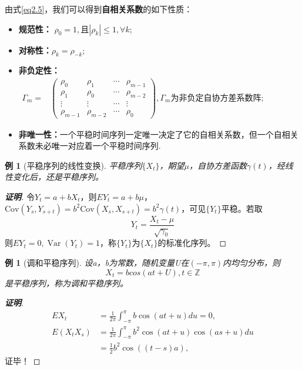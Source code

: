 \documentclass[12pt, a4paper, oneside]{ctexbook}
\newtheorem{example}[theorem]{例}
\newcommand\zm[2]{\begin{proof}[\textbf{#1}]
    #2
\end{proof}}
\newcommand\mb[1]{\mathbb{#1}}
\begin{document}
由式\ref{eq2.5}，我们可以得到\textbf{自相关系数}的如下性质：
\begin{itemize}
    \item \textbf{规范性：} $\rho_0=1,\text{且}|\rho_k|\leq1,\forall k$;
    \item \textbf{对称性：}$\rho_k=\rho_{-k}$;
    \item \textbf{非负定性：}$\begin{aligned}
                  \Gamma_m= & \begin{pmatrix}
                                  \rho_0     & \rho_1     & \cdots & \rho_{m-1} \\
                                  \rho_1     & \rho_0     & \cdots & \rho_{m-2} \\
                                  \vdots     & \vdots     & \cdots & \vdots     \\
                                  \rho_{m-1} & \rho_{m-2} & \cdots & \rho_0
                              \end{pmatrix},\Gamma_m\text{为非负定自协方差系数阵};
              \end{aligned}$
    \item \textbf{非唯一性：}一个平稳时间序列一定唯一决定了它的自相关系数，但一个自相关系数未必唯一对应着一个平稳时间序列.
\end{itemize}

\begin{example}[平稳序列的线性变换]
    平稳序列$\{X_t\}$，期望$\mu$，自协方差函数$\gamma(t)$，经线性变化后，还是平稳序列。
\end{example}
\zm{证明}{令$Y_t=a+bX_t$，则$EY_t=a+b\mu$，$\mathrm{Cov}(Y_s,Y_{s+t})=b^2\mathrm{Cov}(X_s,X_{s+t})=
        b^2\gamma(t)$，可见$\{Y_t\}$平稳。若取
    \begin{equation*}
        Y_t=\frac{X_t-\mu}{\sqrt{\gamma_0}}
    \end{equation*}
    则$EY_t=0,\operatorname{Var}(Y_t)=1$，称$\{Y_t\}$为$\{X_t\}$的标准化序列。
}

\begin{example}[调和平稳序列]\label{ex2.1.7}
    设a，b为常数，随机变量U在$(-\pi,\pi)$内均匀分布，则
    \begin{equation*}
        X_t=bcos(at+U),t \in \mb{Z}
    \end{equation*}
    是平稳序列，称为调和平稳序列。
\end{example}
\zm{证明}{
    \begin{equation*}
        \begin{aligned}
            EX_{t}        & =\frac{1}{2\pi}\int_{-\pi}^{\pi}b\cos(at+u)du=0,            \\
            E(X_{t}X_{s}) & =\frac{1}{2\pi}\int_{-\pi}^{\pi}b^{2}\cos(at+u)\cos(as+u)du \\
                          & =\frac12b^2\cos((t-s)a),
        \end{aligned}
    \end{equation*}
    证毕！
}
\end{document}
